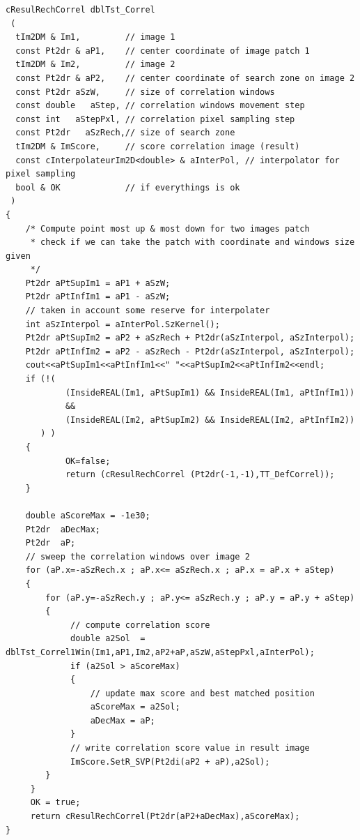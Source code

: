 \documentclass[twoside]{article}
\begin{document}
\begin{lstlisting}
cResulRechCorrel dblTst_Correl
 (
  tIm2DM & Im1,         // image 1
  const Pt2dr & aP1,    // center coordinate of image patch 1
  tIm2DM & Im2,         // image 2
  const Pt2dr & aP2,    // center coordinate of search zone on image 2
  const Pt2dr aSzW,     // size of correlation windows
  const double   aStep, // correlation windows movement step
  const int   aStepPxl, // correlation pixel sampling step
  const Pt2dr   aSzRech,// size of search zone
  tIm2DM & ImScore,     // score correlation image (result)
  const cInterpolateurIm2D<double> & aInterPol, // interpolator for pixel sampling
  bool & OK             // if everythings is ok
 )
{
    /* Compute point most up & most down for two images patch
     * check if we can take the patch with coordinate and windows size given
     */
    Pt2dr aPtSupIm1 = aP1 + aSzW;
    Pt2dr aPtInfIm1 = aP1 - aSzW;
    // taken in account some reserve for interpolater
    int aSzInterpol = aInterPol.SzKernel();
    Pt2dr aPtSupIm2 = aP2 + aSzRech + Pt2dr(aSzInterpol, aSzInterpol);
    Pt2dr aPtInfIm2 = aP2 - aSzRech - Pt2dr(aSzInterpol, aSzInterpol);
    cout<<aPtSupIm1<<aPtInfIm1<<" "<<aPtSupIm2<<aPtInfIm2<<endl;
    if (!(
            (InsideREAL(Im1, aPtSupIm1) && InsideREAL(Im1, aPtInfIm1))
            &&
            (InsideREAL(Im2, aPtSupIm2) && InsideREAL(Im2, aPtInfIm2))
       ) )
    {
            OK=false;
            return (cResulRechCorrel (Pt2dr(-1,-1),TT_DefCorrel));
    }
	
    double aScoreMax = -1e30;
    Pt2dr  aDecMax;
    Pt2dr  aP;
    // sweep the correlation windows over image 2
    for (aP.x=-aSzRech.x ; aP.x<= aSzRech.x ; aP.x = aP.x + aStep)
    {
        for (aP.y=-aSzRech.y ; aP.y<= aSzRech.y ; aP.y = aP.y + aStep)
        {
             // compute correlation score 
             double a2Sol  = dblTst_Correl1Win(Im1,aP1,Im2,aP2+aP,aSzW,aStepPxl,aInterPol);
             if (a2Sol > aScoreMax)
             {
                 // update max score and best matched position
                 aScoreMax = a2Sol;
                 aDecMax = aP;
             }
             // write correlation score value in result image
             ImScore.SetR_SVP(Pt2di(aP2 + aP),a2Sol);
        }
     }
     OK = true;
     return cResulRechCorrel(Pt2dr(aP2+aDecMax),aScoreMax);
}
\end{lstlisting}
\end{document}
